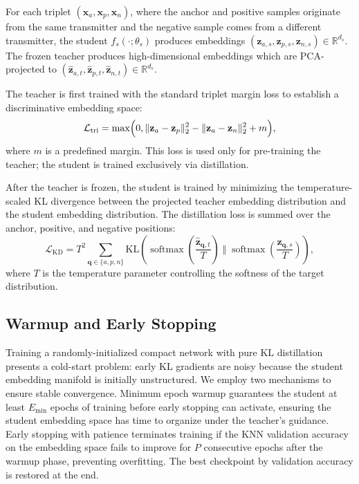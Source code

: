 \documentclass[10pt, conference]{IEEEtran}
\begin{document}
For each triplet $(\mathbf{x}_a, \mathbf{x}_p, \mathbf{x}_n)$, where the anchor and positive samples originate from the same transmitter and the negative sample comes from a different transmitter, the student $f_s(\cdot;\theta_s)$ produces embeddings $(\mathbf{z}_{a,s}, \mathbf{z}_{p,s}, \mathbf{z}_{n,s}) \in \mathbb{R}^{d_s}$.
The frozen teacher produces high-dimensional embeddings which are PCA-projected to $(\hat{\mathbf{z}}_{a,t}, \hat{\mathbf{z}}_{p,t}, \hat{\mathbf{z}}_{n,t}) \in \mathbb{R}^{d_s}$.

The teacher is first trained with the standard triplet margin loss to establish a discriminative embedding space:
\begin{equation}
\label{eq:triplet}
\mathcal{L}_{\text{tri}} =
\max\Bigl(0,
\lVert \mathbf{z}_{a} - \mathbf{z}_{p} \rVert_2^2 -
\lVert \mathbf{z}_{a} - \mathbf{z}_{n} \rVert_2^2 + m
\Bigr),
\end{equation}
where $m$ is a predefined margin. This loss is used only for pre-training the teacher; the student is trained exclusively via distillation.

After the teacher is frozen, the student is trained by minimizing the temperature-scaled KL divergence between the projected teacher embedding distribution and the student embedding distribution.
The distillation loss is summed over the anchor, positive, and negative positions:
\begin{equation}
\label{eq:kd}
\mathcal{L}_{\text{KD}} =
T^2 \sum_{\mathbf{q} \in \{a,p,n\}}
\mathrm{KL}\!\left(
\operatorname{softmax}\!\left(\frac{\hat{\mathbf{z}}_{\mathbf{q},t}}{T}\right)
\;\Big\Vert\;
\operatorname{softmax}\!\left(\frac{\mathbf{z}_{\mathbf{q},s}}{T}\right)
\right),
\end{equation}
where $T$ is the temperature parameter controlling the softness of the target distribution.

\subsection{Warmup and Early Stopping}

Training a randomly-initialized compact network with pure KL distillation presents a cold-start problem: early KL gradients are noisy because the student embedding manifold is initially unstructured.
We employ two mechanisms to ensure stable convergence.
Minimum epoch warmup guarantees the student at least $E_{\min}$ epochs of training before early stopping can activate, ensuring the student embedding space has time to organize under the teacher's guidance.
Early stopping with patience terminates training if the KNN validation accuracy on the embedding space fails to improve for $P$ consecutive epochs after the warmup phase, preventing overfitting.
The best checkpoint by validation accuracy is restored at the end.
\end{document}
